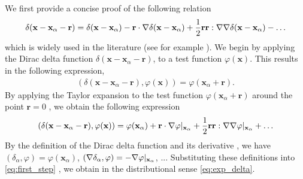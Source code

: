 We first provide a concise proof of the following relation
\begin{equation}
    \delta(\textbf{x} - \textbf{x}_\alpha - \textbf{r})
    = \delta(\textbf{x} - \textbf{x}_\alpha)
    - \textbf{r}\cdot\grad \delta(\textbf{x} - \textbf{x}_\alpha)
    + \frac{1}{2}\textbf{rr}:\grad\grad\delta(\textbf{x} - \textbf{x}_\alpha) 
    - \ldots
\label{eq:exp_delta}
\end{equation}
which is widely used in the literature (see for example \citet{zhang2023evolution}). 
We begin by applying the Dirac delta function $\delta(\textbf{x} - \textbf{x}_\alpha - \textbf{r})$, to a test function $\varphi(\textbf{x})$.
This results in the following expression,
\begin{align*}
    ( \delta(\textbf{x} - \textbf{x}_\alpha - \textbf{r}), \varphi(\textbf{x})) 
    =
    \varphi(\textbf{x}_\alpha + \textbf{r}).  
\end{align*}
By applying the Taylor expansion to the test function $\varphi(\textbf{x}_\alpha + \textbf{r})$ around the point $\textbf{r} = 0$ , we obtain the following expression
\begin{equation}
    ( \delta(\textbf{x} - \textbf{x}_\alpha - \textbf{r}), \varphi(\textbf{x})) 
    =
    \varphi(\textbf{x}_\alpha) 
    + \textbf{r} \cdot \grad \varphi|_{\textbf{x}_\alpha}
    + \frac{1}{2}\textbf{r}\textbf{r} : \grad\grad \varphi|_{\textbf{x}_\alpha}
    + \ldots
    \label{eq:first_step}
\end{equation}
By the definition of the Dirac delta function and its derivative \citep{appel2007}, we have  %
$  (\delta_\alpha, \varphi) = \varphi(\textbf{x}_\alpha)$, %
$(\mathbf{\nabla}\delta_\alpha, \varphi) = -\mathbf{\nabla}\varphi|_{\textbf{x}_\alpha} $,
$...$  
Substituting these definitions into \ref{eq:first_step} , we obtain in the distributional sense \ref{eq:exp_delta}. 

